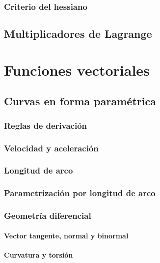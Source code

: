 \documentclass[12pt, fleqn]{report}                             %
\begin{document}
			\subsection{Criterio del hessiano}
			
		\section{Multiplicadores de Lagrange}


	\chapter{Funciones vectoriales}
	
		\section{Curvas en forma paramétrica}
		
			\subsection{Reglas de derivación}
			
			\subsection{Velocidad y aceleración}
		
			\subsection{Longitud de arco}
			
			\subsection{Parametrización por longitud de arco}
			
			\subsection{Geometría diferencial}
				
				\subsubsection{Vector tangente, normal y binormal}
				
				\subsubsection{Curvatura y torsión}
				
\end{document}
